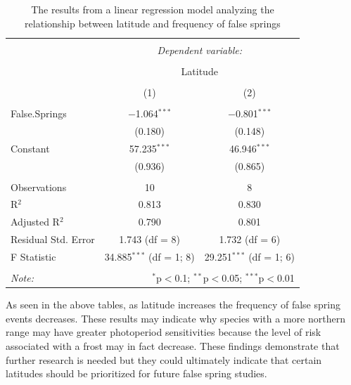 \documentclass{article}\usepackage[]{graphicx}\usepackage[]{color}
\begin{document}
\begin{table}[!htbp] \centering 
  \caption{The results from a linear regression model analyzing the relationship between latitude and frequency of false springs} 
  \label{} 
\begin{tabular}{@{\extracolsep{5pt}}lcc} 
\\[-1.8ex]\hline 
\hline \\[-1.8ex] 
 & \multicolumn{2}{c}{\textit{Dependent variable:}} \\ 
\cline{2-3} 
\\[-1.8ex] & \multicolumn{2}{c}{Latitude} \\ 
\\[-1.8ex] & (1) & (2)\\ 
\hline \\[-1.8ex] 
 False.Springs & $-$1.064$^{***}$ & $-$0.801$^{***}$ \\ 
  & (0.180) & (0.148) \\ 
  Constant & 57.235$^{***}$ & 46.946$^{***}$ \\ 
  & (0.936) & (0.865) \\ 
 \hline \\[-1.8ex] 
Observations & 10 & 8 \\ 
R$^{2}$ & 0.813 & 0.830 \\ 
Adjusted R$^{2}$ & 0.790 & 0.801 \\ 
Residual Std. Error & 1.743 (df = 8) & 1.732 (df = 6) \\ 
F Statistic & 34.885$^{***}$ (df = 1; 8) & 29.251$^{***}$ (df = 1; 6) \\ 
\hline 
\hline \\[-1.8ex] 
\textit{Note:}  & \multicolumn{2}{r}{$^{*}$p$<$0.1; $^{**}$p$<$0.05; $^{***}$p$<$0.01} \\ 
\end{tabular} 
\end{table} 


As seen in the above tables, as latitude increases the frequency of false spring events decreases. These results may indicate why species with a more northern range may have greater photoperiod sensitivities \citep{Caffarra2011} because the level of risk associated with a frost may in fact decrease. These findings demonstrate that further research is needed but they could ultimately indicate that certain latitudes should be prioritized for future false spring studies. 
\end{document}
